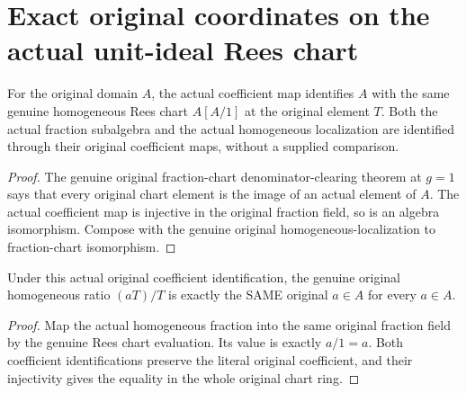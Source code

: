 \section{Exact original coordinates on the actual unit-ideal Rees chart}

\begin{definition}
\label{def:fc-original-unit-rees-chart-coefficients}
\leanok
{}
For the original domain $A$, the actual coefficient map identifies
$A$ with the same genuine homogeneous Rees chart $A[A/1]$ at the
original element $T$. Both the actual fraction subalgebra and the
actual homogeneous localization are identified through their
original coefficient maps, without a supplied comparison.
\end{definition}
\begin{proof}
The genuine original fraction-chart denominator-clearing theorem at
$g=1$ says that every original chart element is the image of an
actual element of $A$. The actual coefficient map is injective in
the original fraction field, so is an algebra isomorphism. Compose
with the genuine original homogeneous-localization to fraction-chart
isomorphism.
\end{proof}

\begin{theorem}
\label{thm:fc-original-unit-rees-coordinate-ratio}
\leanok
{}
Under this actual original coefficient identification, the genuine
original homogeneous ratio $(aT)/T$ is exactly the SAME original
$a\in A$ for every $a\in A$.
\end{theorem}
\begin{proof}
Map the actual homogeneous fraction into the same original fraction
field by the genuine Rees chart evaluation. Its value is exactly
$a/1=a$. Both coefficient identifications preserve the literal
original coefficient, and their injectivity gives the equality in
the whole original chart ring.
\end{proof}

